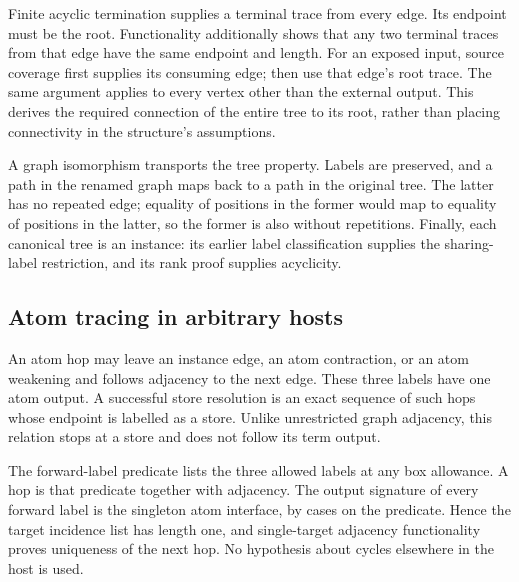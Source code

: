 
Finite acyclic termination supplies a terminal trace from every edge.
Its endpoint must be the root. Functionality additionally shows that any
two terminal traces from that edge have the same endpoint and length.
For an exposed input, source coverage first supplies its consuming edge;
then use that edge's root trace. The same argument applies to every vertex
other than the external output. This derives the required connection of
the entire tree to its root, rather than placing connectivity in the
structure's assumptions.





A graph isomorphism transports the tree property. Labels are preserved,
and a path in the renamed graph maps back to a path in the original tree.
The latter has no repeated edge; equality of positions in the former would
map to equality of positions in the latter, so the former is also without
repetitions. Finally, each canonical tree is an instance: its earlier label
classification supplies the sharing-label restriction, and its rank proof
supplies acyclicity.



\subsection{Atom tracing in arbitrary hosts}
An atom hop may leave an instance edge, an atom contraction, or an atom
weakening and follows adjacency to the next edge. These three labels have
one atom output. A successful store resolution is an exact sequence of
such hops whose endpoint is labelled as a store. Unlike unrestricted graph
adjacency, this relation stops at a store and does not follow its term output.

The forward-label predicate lists the three allowed labels at any box
allowance. A hop is that predicate together with adjacency. The output
signature of every forward label is the singleton atom interface, by cases
on the predicate. Hence the target incidence list has length one, and
single-target adjacency functionality proves uniqueness of the next hop.
No hypothesis about cycles elsewhere in the host is used.

